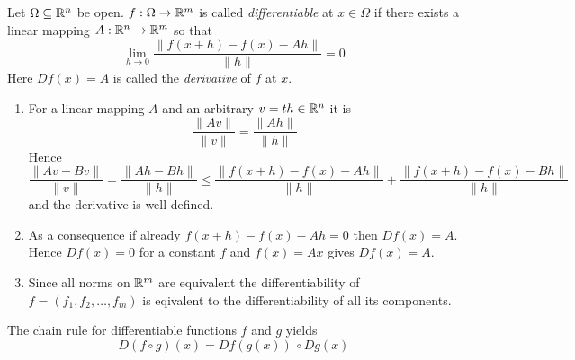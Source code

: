 \begin{definition}
    Let \( \Omega \subseteq \mathbb{R}^n \) be open. \( f : \Omega \to \mathbb{R}^m \) is called \emph{differentiable}
    at \( x \in \Omega \) if there exists a linear mapping \( A: \mathbb{R}^n \to \mathbb{R}^m \) so that
    \[
        \lim_{h \to 0} \frac{\|f(x + h) - f(x) - Ah\|}{\|h\|} = 0
    \]
    Here \( Df(x) = A \) is called the \emph{derivative} of \( f \) at \( x \).
\end{definition}
\bigskip


\begin{remarks}\hfill
    \begin{enumerate}
        \item For a linear mapping \( A \) and an arbitrary \( v = th \in \mathbb{R}^n \) it is
              \[
                  \frac{\|Av\|}{\|v\|} = \frac{\|Ah\|}{\|h\|}
              \]
              Hence
              \[
                  \frac{\|Av - Bv\|}{\|v\|} = \frac{\|Ah - Bh\|}{\|h\|}\le
                  \frac{\|f(x + h) - f(x) - Ah\|}{\|h\|} + \frac{\|f(x + h) - f(x) - Bh\|}{\|h\|}
              \]
              and the derivative is well defined.
        \item As a consequence if already \( f(x + h) - f(x) - Ah = 0 \) then \( Df(x) = A \).
              Hence \( Df(x) = 0 \) for a constant  \( f \) and \( f(x) = Ax \) gives \( Df(x) = A \).
        \item Since all norms on \( \mathbb{R}^m \) are equivalent the differentiability of \( f = (f_1, f_2, \dots, f_m) \)
              is eqivalent to the differentiability of all its components.
    \end{enumerate}
\end{remarks}
\bigskip


\begin{lemma}
    The chain rule for differentiable functions \( f \) and \( g \) yields
    \[
        D(f \circ g)(x) = Df(g(x))\, \circ Dg(x)
    \]
\end{lemma}
\bigskip


